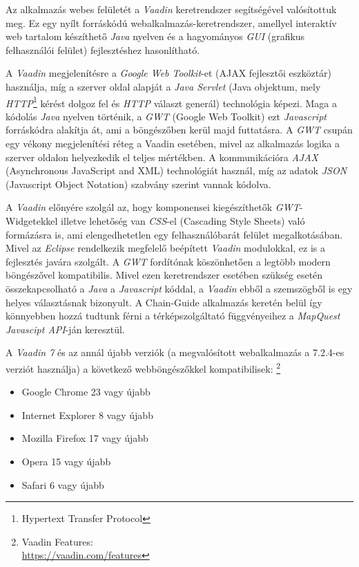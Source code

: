 \par Az alkalmazás webes felületét a \textit{Vaadin} keretrendszer segítségével valósítottuk meg. Ez egy nyílt forráskódú webalkalmazás-keretrendszer, amellyel interaktív web tartalom készíthető \textit{Java} nyelven és a hagyományos \textit{GUI} (grafikus felhasználói felület) fejlesztéshez hasonlítható. 
\par A \textit{Vaadin} megjelenítésre a \textit{Google Web Toolkit}-et (AJAX fejlesztői eszköztár) használja, míg a szerver oldal alapját a \textit{Java Servlet}  (Java objektum, mely \textit{HTTP}\footnote{Hypertext Transfer Protocol} kérést dolgoz fel és \textit{HTTP} választ generál) technológia képezi. Maga a kódolás \textit{Java} nyelven történik, a \textit{GWT} (Google Web Toolkit) ezt \textit{Javascript} forráskódra alakítja át, ami a böngészőben kerül majd futtatásra. A \textit{GWT} csupán egy vékony megjelenítési réteg a Vaadin esetében, mivel az alkalmazás logika a szerver oldalon helyezkedik el teljes mértékben. A kommunikációra \textit{AJAX} (Asynchronous JavaScript and XML) technológiát használ, míg az adatok \textit{JSON} (Javascript Object Notation) szabvány szerint vannak kódolva.
\par A\textit{ Vaadin} előnyére szolgál az, hogy komponensei kiegészíthetők \textit{GWT}-Widgetekkel illetve lehetőség van  \textit{CSS}-el (Cascading Style Sheets) való formázásra is, ami elengedhetetlen egy felhasználóbarát felület megalkotásában. Mivel az \textit{Eclipse} rendelkezik megfelelő beépített \textit{Vaadin} modulokkal, ez is a fejlesztés javára szolgált. A \textit{GWT} fordítónak köszönhetően a legtöbb modern böngészővel kompatibilis. Mivel ezen keretrendszer esetében szükség esetén összekapcsolható a \textit{Java} a\textit{ Javascript} kóddal, a \textit{Vaadin} ebből a szemszögből is egy helyes választásnak bizonyult. A Chain-Guide alkalmazás keretén belül így könnyebben hozzá tudtunk férni a térképszolgáltató függvényeihez a \textit{MapQuest Javascipt API}-ján keresztül. 
\par A \textit{Vaadin 7} és az annál újabb verziók  (a megvalósított webalkalmazás a 7.2.4-es verziót használja) a következő webböngészőkkel kompatibilisek: \footnote{Vaadin Features: \\ \href{https://vaadin.com/features}{https://vaadin.com/features}}
\par
\begin{itemize}
  \item Google Chrome 23 vagy újabb
  \item Internet Explorer 8 vagy újabb
  \item Mozilla Firefox 17 vagy újabb
  \item Opera 15 vagy újabb
  \item Safari 6 vagy újabb 
\end{itemize}

